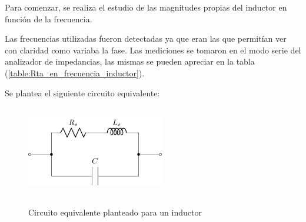 Para comenzar, se realiza el estudio de las magnitudes propias del inductor en función de la frecuencia. \par Las frecuencias utilizadas fueron detectadas ya que eran las que permitían ver con claridad como variaba la fase. Las mediciones se tomaron en el modo serie del analizador de impedancias, las mismas se pueden apreciar en la tabla (\ref{table:Rta_en_frecuencia_inductor}).


Se plantea el siguiente circuito equivalente:

\begin{figure}[H]
\centering
\includegraphics[width=6cm,height=4cm]{Ejercicio_1(Germo)/Circuitos/circuito_equivalente_inductancia.pdf}
\label{fig:circuito_equivalente_inductancia}
\caption{Circuito equivalente planteado para un inductor}
\end{figure}

